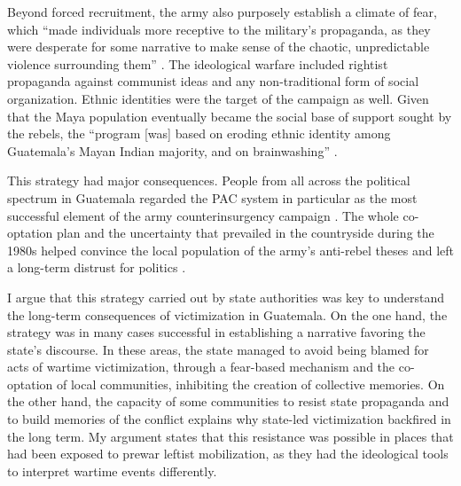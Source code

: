 \documentclass[12pt, notitlepage]{article}
\begin{document}
Beyond forced recruitment, the army also purposely establish a climate of fear, which ``made individuals more receptive to the military's propaganda, as they were desperate for some narrative to make sense of the chaotic, unpredictable violence surrounding them'' \citep[643]{Bateson:2017aa}.
The ideological warfare included rightist propaganda against communist ideas and any non-traditional form of social organization.
Ethnic identities were the target of the campaign as well.
Given that the Maya population eventually became the social base of support sought by the rebels, the ``program [was] based on eroding ethnic identity among Guatemala's Mayan Indian majority, and on brainwashing'' \citep[21]{Black:1985aa}.

This strategy had major consequences.
People from all across the political spectrum in Guatemala regarded the PAC system in particular as the most successful element of the army counterinsurgency campaign \citep{Garrard-Burnett:2010aa}.
The whole co-optation plan and the uncertainty that prevailed in the countryside during the 1980s helped convince the local population of the army's anti-rebel theses and left a long-term distrust for politics \citep{Green:1995aa}.

I argue that this strategy carried out by state authorities was key to understand the long-term consequences of victimization in Guatemala.
On the one hand, the strategy was in many cases successful in establishing a narrative favoring the state's discourse.
In these areas, the state managed to avoid being blamed for acts of wartime victimization, through a fear-based mechanism and the co-optation of local communities, inhibiting the creation of collective memories.
On the other hand, the capacity of some communities to resist state propaganda and to build memories of the conflict explains why state-led victimization backfired in the long term.
My argument states that this resistance was possible in places that had been exposed to prewar leftist mobilization, as they had the ideological tools to interpret wartime events differently.

\end{document}
